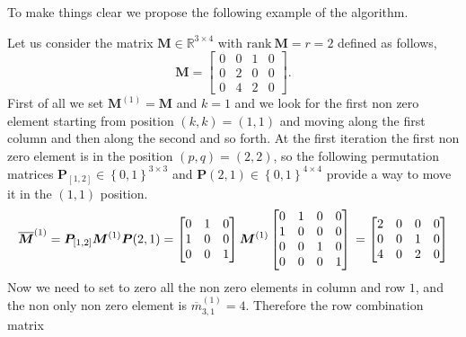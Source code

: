 		To make things clear we propose the following example of the algorithm.
		\begin{example}
			Let us consider the matrix $\bm{M}\in\mathbb{R}^{3\times 4}$ 
			with $\textrm{rank}~\bm{M} = r = 2$ defined as follows,
			\begin{equation}
				\bm{M} = 
				\begin{bmatrix}
					0 & 0 & 1 & 0 \\
					0 & 2 & 0 & 0 \\
					0 & 4 & 2 & 0
 				\end{bmatrix}.
			\end{equation}
			First of all we set $\bm{M}^{(1)} = \bm{M}$ and $k=1$ and we look for the
			first non zero element starting from position $(k,k) = (1,1)$ and moving 
			along the first column and then along the second and so forth.
			At the first iteration the first non zero element is in the 
			position $(p,q) = (2,2)$, so the following permutation matrices 
			$\bm{P}_{[1,2]}\in\left\lbrace0,1 \right\rbrace^{3\times 3}$ and 
			$\bm{P}(2,1)\in\left\lbrace 0,1 \right\rbrace^{4\times 4}$
			provide a way to move it in the $(1,1)$ position. 
			\begin{equation}
					\overline{\bm{M}}^{(1)} = \bm{P}_{[1,2]}\bm{M}^{(1)}\bm{P}(2,1) = 
					\begin{bmatrix}
						0 & 1 & 0 \\
						1 & 0 & 0 \\
						0 & 0 & 1 \\
					\end{bmatrix}
					\bm{M}^{(1)}
					\begin{bmatrix}
						0 & 1 & 0 & 0 \\
						1 & 0 & 0 & 0 \\
						0 & 0 & 1 & 0 \\
						0 & 0 & 0 & 1
					\end{bmatrix} \\
					=  
					\begin{bmatrix}
						2 & 0 & 0 & 0 \\
						0 & 0 & 1 & 0 \\
						4 & 0 & 2 & 0 \\
					\end{bmatrix}
			\end{equation}
			Now we need to set to zero all the non zero elements in column and row $1$,
			and the non only non zero element is $\overline{m}_{3,1}^{(1)} = 4$.
			Therefore the row combination matrix 

\end{example}
